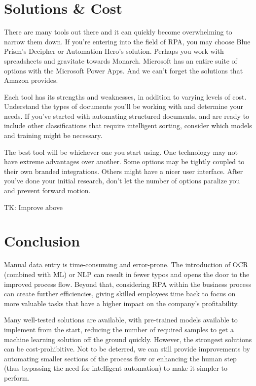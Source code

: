 \documentclass[conference, draftcls]{IEEEtran}
\begin{document}
\section{Solutions \& Cost} \label{sectionSolutionsCost}
There are many tools out there and it can quickly become overwhelming to narrow them down. If you're entering into the field of RPA, you may choose Blue Prism's Decipher or Automation Hero's solution. Perhaps you work with spreadsheets and gravitate towards Monarch. Microsoft has an entire suite of options with the Microsoft Power Apps. And we can't forget the solutions that Amazon provides.

Each tool has its strengths and weaknesses, in addition to varying levels of cost. Understand the types of documents you'll be working with and determine your needs. If you've started with automating structured documents, and are ready to include other classifications that require intelligent sorting, consider which models and training might be necessary.

The best tool will be whichever one you start using. One technology may not have extreme advantages over another. Some options may be tightly coupled to their own branded integrations. Others might have a nicer user interface. After you've done your initial research, don't let the number of options paralize you and prevent forward motion.

TK: Improve above

\section{Conclusion}
Manual data entry is time-consuming and error-prone. The introduction of OCR (combined with ML) or NLP can result in fewer typos and opens the door to the improved process flow. Beyond that, considering RPA within the business process can create further efficiencies, giving skilled employees time back to focus on more valuable tasks that have a higher impact on the company's profitability.

Many well-tested solutions are available, with pre-trained models available to implement from the start, reducing the number of required samples to get a machine learning solution off the ground quickly. However, the strongest solutions can be cost-prohibitive. Not to be deterred, we can still provide improvements by automating smaller sections of the process flow or enhancing the human step (thus bypassing the need for intelligent automation) to make it simpler to perform.
\end{document}
